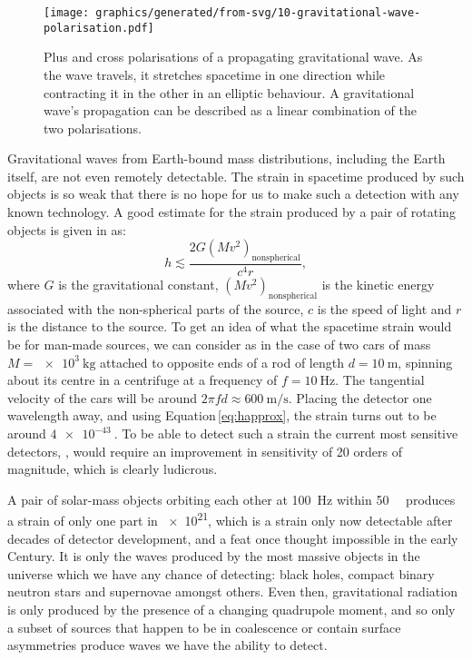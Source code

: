 \begin{figure}
  \centering
  \texttt{[image: graphics/generated/from-svg/10-gravitational-wave-polarisation.pdf]}
  \caption[Plus and cross polarisations of a propagating gravitational wave]{\label{fig:gravitational-wave-polarisation}Plus and cross polarisations of a propagating gravitational wave. As the wave travels, it stretches spacetime in one direction while contracting it in the other in an elliptic behaviour. A gravitational wave's propagation can be described as a linear combination of the two polarisations.}
\end{figure}

Gravitational waves from Earth-bound mass distributions, including the Earth itself, are not even remotely detectable. The strain in spacetime produced by such objects is so weak that there is no hope for us to make such a detection with any known technology. A good estimate for the strain produced by a pair of rotating objects is given in \cite{Sathyaprakash2009} as:
\begin{equation}
  \label{eq:happrox}
  h \lesssim \frac{2 G \left( M v^{2} \right)_{\text{nonspherical}}}{c^4 r},
\end{equation}
where $G$ is the gravitational constant, $\left( M v^{2} \right)_{\text{nonspherical}}$ is the kinetic energy associated with the non-spherical parts of the source, $c$ is the speed of light and $r$ is the distance to the source. To get an idea of what the spacetime strain would be for man-made sources, we can consider as in \cite{Sathyaprakash2009} the case of two cars of mass $M = \SI{e3}{\kilo\gram}$ attached to opposite ends of a rod of length $d = \SI{10}{\meter}$, spinning about its centre in a centrifuge at a frequency of $f = \SI{10}{\hertz}$. The tangential velocity of the cars will be around $2 \pi f d \approx \SI{600}{\meter\per\second}$. Placing the detector one wavelength away, and using Equation\,\ref{eq:happrox}, the strain turns out to be around $\SI{4e-43}{}$. To be able to detect such a strain the current most sensitive detectors, \ALIGO{}, would require an improvement in sensitivity of \SI{20}{} orders of magnitude, which is clearly ludicrous.

A pair of solar-mass objects orbiting each other at \SI{100}{\hertz} within \SI{50}{\mega\lightyear} produces a strain of only one part in \SI{e21}{}, which is a strain only now detectable after decades of detector development, and a feat once thought impossible in the early  Century. It is only the waves produced by the most massive objects in the universe which we have any chance of detecting: black holes, compact binary neutron stars and supernovae amongst others. Even then, gravitational radiation is only produced by the presence of a changing quadrupole moment, and so only a subset of sources that happen to be in coalescence or contain surface asymmetries produce waves we have the ability to detect.

